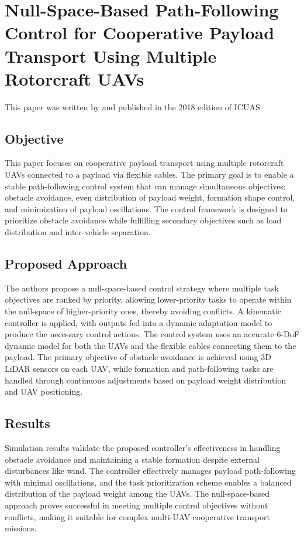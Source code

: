 \documentclass[a4paper,12pt]{article}
\begin{document}
\section{Null-Space-Based Path-Following Control for Cooperative Payload Transport Using Multiple Rotorcraft UAVs}
	This paper was written by and published in the 2018 edition of ICUAS

\subsection{Objective}
This paper focuses on cooperative payload transport using multiple rotorcraft UAVs connected to a payload via flexible cables. The primary goal is to enable a stable path-following control system that can manage simultaneous objectives: obstacle avoidance, even distribution of payload weight, formation shape control, and minimization of payload oscillations. The control framework is designed to prioritize obstacle avoidance while fulfilling secondary objectives such as load distribution and inter-vehicle separation.

\subsection{Proposed Approach}
The authors propose a null-space-based control strategy where multiple task objectives are ranked by priority, allowing lower-priority tasks to operate within the null-space of higher-priority ones, thereby avoiding conflicts. A kinematic controller is applied, with outputs fed into a dynamic adaptation model to produce the necessary control actions. The control system uses an accurate 6-DoF dynamic model for both the UAVs and the flexible cables connecting them to the payload. The primary objective of obstacle avoidance is achieved using 3D LiDAR sensors on each UAV, while formation and path-following tasks are handled through continuous adjustments based on payload weight distribution and UAV positioning.

\subsection{Results}
Simulation results validate the proposed controller’s effectiveness in handling obstacle avoidance and maintaining a stable formation despite external disturbances like wind. The controller effectively manages payload path-following with minimal oscillations, and the task prioritization scheme enables a balanced distribution of the payload weight among the UAVs. The null-space-based approach proves successful in meeting multiple control objectives without conflicts, making it suitable for complex multi-UAV cooperative transport missions.

\printbibliography
\end{document}
